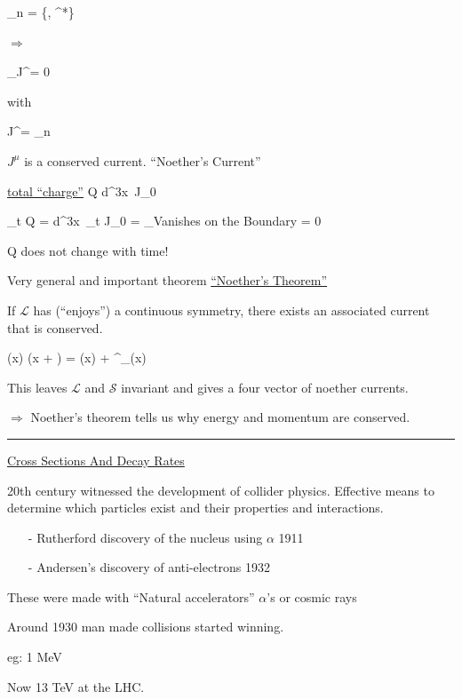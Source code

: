 {\be
\phi_n = \{\phi, \phi^*\}
\ee

$\Rightarrow$

\be
\partial_\mu J^\mu = 0
\ee

with 

\be
J^\mu = \sum_n 
\ee

$J^\mu$ is a conserved current.  ``Noether's Current''


\underline{total ``charge''}
\be
Q \equiv \int d^3x\ J_0 
\ee


\be
\partial_t Q = \int d^3x\ \partial_t J_0 = _{\textrm{Vanishes on the Boundary}} = 0
\ee
 
Q does not change with time! 

Very general and important theorem \underline{``Noether's Theorem''}

If $\mathcal{L}$ has (``enjoys'') a continuous symmetry, there exists an associated current that is conserved. 

\be
\phi(x) \rightarrow \phi(x + \epsilon) = \phi(x) + \epsilon^\mu \partial_\mu \phi(x)
\ee

This leaves $\mathcal{L}$ and $\mathcal{S}$ invariant and gives a four vector of noether currents. 

$\Rightarrow$ Noether's theorem tells us why energy and momentum are conserved. 


\noindent\rule{\textwidth}{1pt}

\clearpage

\underline{\Large Cross Sections And Decay Rates}

20th century witnessed the development of collider physics. 
Effective means to determine which particles exist and their properties and interactions.

\begin{itemize}
\item[-] Rutherford discovery of the nucleus using $\alpha$ 1911 
\item[-] Andersen's discovery of anti-electrons 1932
\end{itemize}

These were made with ``Natural accelerators'' $\alpha$'s or cosmic rays

Around 1930 man made collisions started winning. 

eg: 1 MeV 

Now 13 TeV at the LHC.

}
